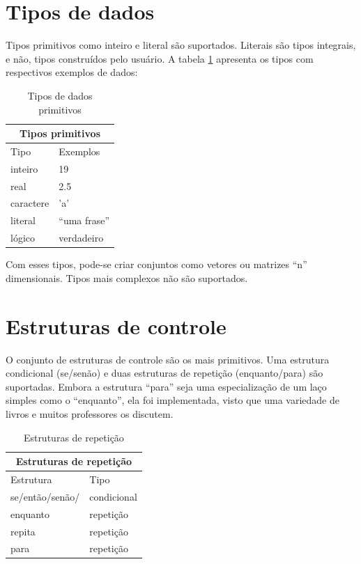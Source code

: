 \documentclass[a4paper,11pt]{report}
\begin{document}
\section{Tipos de dados}

Tipos primitivos como inteiro e literal são suportados. Literais são tipos
integrais, e não, tipos construídos pelo usuário. A tabela
\ref{tb_tipos_primitivos} apresenta os tipos com respectivos exemplos de dados:

\begin{table}[ht]
\begin{center}
  \begin{tabular}{|l|l|}
    \hline
    \multicolumn{2}{|c|}{Tipos primitivos} \\
    \hline
      Tipo & Exemplos \\
    \hline
    inteiro & 19 \\
    real & 2.5 \\
    caractere & 'a' \\
    literal & ``uma frase'' \\
    lógico & verdadeiro \\
    \hline
  \end{tabular}
  \caption{Tipos de dados primitivos}
  \label{tb_tipos_primitivos}
\end{center}
\end{table}

Com esses tipos, pode-se criar conjuntos como vetores ou matrizes ``n''
dimensionais. Tipos mais complexos não são suportados.

\section{Estruturas de controle}

O conjunto de estruturas de controle são os mais primitivos. Uma
estrutura condicional (se/senão) e duas estruturas de repetição (enquanto/para)
são suportadas. Embora a estrutura ``para'' seja uma especialização de um laço
simples como o ``enquanto'', ela foi implementada, visto que uma variedade
de livros e muitos professores os discutem.

\begin{table}[h!t]
  \begin{center}
    \begin{tabular}{|l|l|}
      \hline
      \multicolumn{2}{|c|}{Estruturas de repetição} \\
      \hline
        Estrutura & Tipo \\
      \hline
      se/então/senão/& condicional \\
      enquanto & repetição \\
      repita & repetição \\
      para & repetição \\
      \hline
    \end{tabular}

    \caption{Estruturas de repetição}
  \end{center}
\end{table}
\end{document}

